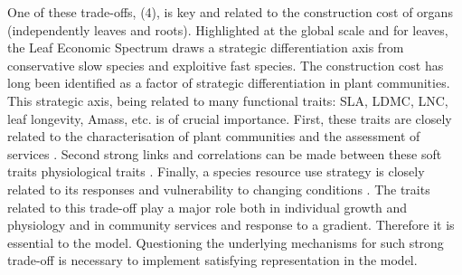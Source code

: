 One of these trade-offs, (4), is key and related to the construction cost of organs (independently leaves and roots). Highlighted at the global scale and for leaves, the Leaf Economic Spectrum \parencite{wright_worldwide_2004} draws a strategic differentiation axis from conservative slow species and exploitive fast species. The construction cost has long been identified as a factor of strategic differentiation in plant communities\parencite{westoby_leaf-height-seed_1998}. This strategic axis, being related to many functional traits: SLA, LDMC, LNC, leaf longevity, Amass, etc.\parencite{wright_worldwide_2004} is of crucial importance. First, these traits are closely related to the characterisation of plant communities and the assessment of services \parencite{grime_benefits_1998}. Second strong links and correlations can be made between these soft traits physiological traits \parencite{craine_functional_2002, reich_variation_2003, wright_worlwide_2004}. Finally, a species resource use strategy is closely related to its responses and vulnerability to changing conditions \parencite{poorter_causes_2009, dwyer_specific_2014, deleglise_drought-induced_2015}. The traits related to this trade-off play a major role both in individual growth and physiology and in community services and response to a gradient. Therefore it is essential to the model. Questioning the underlying mechanisms for such strong trade-off is necessary to implement satisfying representation in the model.\\


